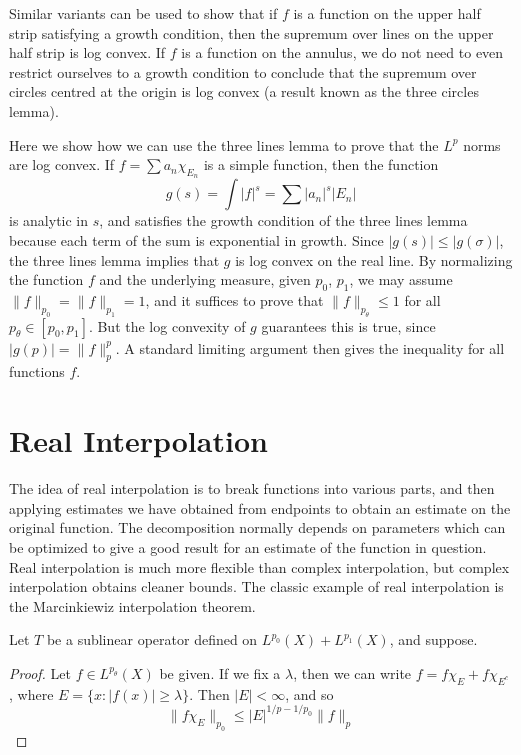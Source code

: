 \begin{remark}
	Similar variants can be used to show that if $f$ is a function on the upper half strip satisfying a growth condition, then the supremum over lines on the upper half strip is log convex. If $f$ is a function on the annulus, we do not need to even restrict ourselves to a growth condition to conclude that the supremum over circles centred at the origin is log convex (a result known as the three circles lemma).
\end{remark}

\begin{example}
	Here we show how we can use the three lines lemma to prove that the $L^p$ norms are log convex. If $f = \sum a_n \chi_{E_n}$ is a simple function, then the function
	\[ g(s) = \int |f|^s = \sum |a_n|^s |E_n| \]
	is analytic in $s$, and satisfies the growth condition of the three lines lemma because each term of the sum is exponential in growth. Since $|g(s)| \leq |g(\sigma)|$, the three lines lemma implies that $g$ is log convex on the real line. By normalizing the function $f$ and the underlying measure, given $p_0$, $p_1$, we may assume $\| f \|_{p_0} = \| f \|_{p_1} = 1$, and it suffices to prove that $\| f \|_{p_\theta} \leq 1$ for all $p_\theta \in [p_0, p_1]$. But the log convexity of $g$ guarantees this is true, since $|g(p)| = \| f \|_p^p$. A standard limiting argument then gives the inequality for all functions $f$.
\end{example}

\section{Real Interpolation}

The idea of real interpolation is to break functions into various parts, and then applying estimates we have obtained from endpoints to obtain an estimate on the original function. The decomposition normally depends on parameters which can be optimized to give a good result for an estimate of the function in question. Real interpolation is much more flexible than complex interpolation, but complex interpolation obtains cleaner bounds. The classic example of real interpolation is the Marcinkiewiz interpolation theorem.

\begin{theorem}
	Let $T$ be a sublinear operator defined on $L^{p_0}(X) + L^{p_1}(X)$, and suppose.
\end{theorem}
\begin{proof}
	Let $f \in L^{p_\theta}(X)$ be given. If we fix a $\lambda$, then we can write $f = f \chi_E + f \chi_{E^c}$, where $E = \{ x: |f(x)| \geq \lambda \}$. Then $|E| < \infty$, and so
	\[ \| f \chi_E \|_{p_0} \leq |E|^{1/p-1/p_0} \| f \|_p \]
\end{proof}

